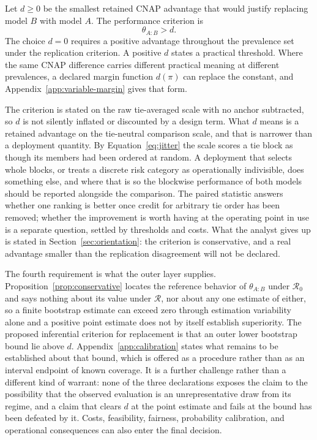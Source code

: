 \documentclass[11pt]{article}
\newcommand{\Regime}{\mathcal{R}}
\theoremstyle{remark}
\begin{document}
Let $d\geq0$ be the smallest retained CNAP advantage that would justify replacing model $B$ with model $A$. The performance criterion is
\begin{equation}
\theta_{A:B}>d.
\label{eq:replacement}
\end{equation}
The choice $d=0$ requires a positive advantage throughout the prevalence set under the replication criterion. A positive $d$ states a practical threshold. Where the same CNAP difference carries different practical meaning at different prevalences, a declared margin function $d(\pi)$ can replace the constant, and Appendix~\ref{app:variable-margin} gives that form.

The criterion is stated on the raw tie-averaged scale with no anchor subtracted, so $d$ is not silently inflated or discounted by a design term. What $d$ means is a retained advantage on the tie-neutral comparison scale, and that is narrower than a deployment quantity. By Equation~\eqref{eq:jitter} the scale scores a tie block as though its members had been ordered at random. A deployment that selects whole blocks, or treats a discrete risk category as operationally indivisible, does something else, and where that is so the blockwise performance of both models should be reported alongside the comparison. The paired statistic answers whether one ranking is better once credit for arbitrary tie order has been removed; whether the improvement is worth having at the operating point in use is a separate question, settled by thresholds and costs. What the analyst gives up is stated in Section~\ref{sec:orientation}: the criterion is conservative, and a real advantage smaller than the replication disagreement will not be declared.

The fourth requirement is what the outer layer supplies. Proposition~\ref{prop:conservative} locates the reference behavior of $\theta_{A:B}$ under $\Regime_0$ and says nothing about its value under $\Regime$, nor about any one estimate of either, so a finite bootstrap estimate can exceed zero through estimation variability alone and a positive point estimate does not by itself establish superiority. The proposed inferential criterion for replacement is that an outer lower bootstrap bound lie above $d$. Appendix~\ref{app:calibration} states what remains to be established about that bound, which is offered as a procedure rather than as an interval endpoint of known coverage. It is a further challenge rather than a different kind of warrant: none of the three declarations exposes the claim to the possibility that the observed evaluation is an unrepresentative draw from its regime, and a claim that clears $d$ at the point estimate and fails at the bound has been defeated by it. Costs, feasibility, fairness, probability calibration, and operational consequences can also enter the final decision.
\end{document}
